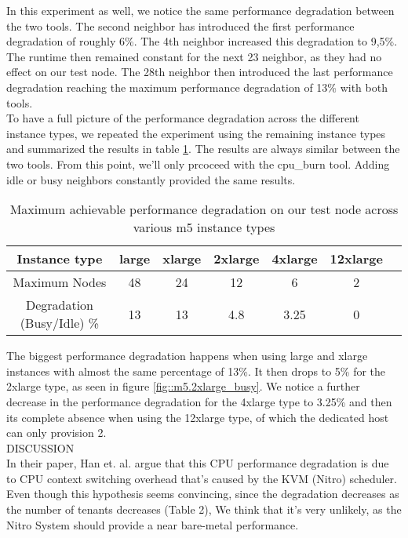 \noindent
In this experiment as well, we notice the same performance degradation between the two tools. The second 
neighbor has introduced the first performance degradation of roughly 6\%. The 4th neighbor increased 
this degradation to 9,5\%. The runtime then remained constant for the next 23 neighbor, as they had no 
effect on our test node. The 28th neighbor then introduced the last performance degradation reaching the 
maximum performance degradation of 13\% with both tools. \\
To have a full picture of the performance degradation across the different instance types, we repeated 
the experiment using the remaining instance types and summarized the results in table \ref{tab::all_m5}.
The results are always similar between the two tools. From this point, we'll only prcoceed 
with the cpu\_burn tool. Adding idle or busy neighbors constantly provided the same results. 
\begin{table}[H]
\centering
\begin{tabular}{ |c|c|c|c|c|c|c }
 Instance type & large & xlarge & 2xlarge & 4xlarge  & 12xlarge  \\
 \hline
 Maximum Nodes & 48 & 24 & 12 & 6 & 2 \\
 \hline
Degradation (Busy/Idle) \% & 13 & 13 & 4.8 & 3.25 & 0  \\ 

\end{tabular}
\caption{Maximum achievable performance degradation on our test node across various m5 instance types}
\label{tab::all_m5}
\end{table}
\noindent
The biggest performance degradation happens when using large and xlarge instances with almost the same 
percentage of 13\%. It then drops to 5\% for the 2xlarge type, as seen in figure \ref{fig::m5.2xlarge_busy}.
We notice a further decrease in the performance degradation for the 4xlarge type to 3.25\% and then its complete 
absence when using the 12xlarge type, of which the dedicated host can only provision 2. \\
DISCUSSION \\ 
In their paper, Han et. al. \cite{contention} argue that this CPU performance degradation is due to CPU 
context switching overhead that's caused by the KVM (Nitro) scheduler. Even though this hypothesis 
seems convincing, since the degradation decreases as the number of tenants decreases (Table 2), 
We think that it's very unlikely, as the Nitro System should provide a near bare-metal performance. \\

